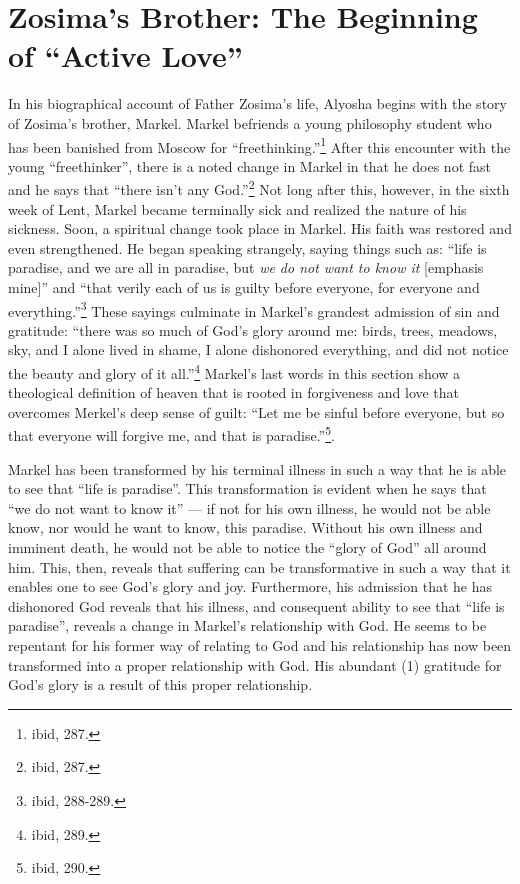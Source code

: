  \section{Zosima's Brother: The Beginning of ``Active Love''}
  
  In his biographical account of Father Zosima's life, Alyosha begins with the story of Zosima's brother, Markel. Markel befriends a young philosophy student who has been banished from Moscow for ``freethinking.''\footnote{ibid, 287.} After this encounter with the young ``freethinker'', there is a noted change in Markel in that he does not fast and he says that ``there isn't any God.''\footnote{ibid, 287.} Not long after this, however, in the sixth week of Lent, Markel became terminally sick and realized the nature of his sickness. Soon, a spiritual change took place in Markel. His faith was restored and even strengthened. He began speaking strangely, saying things such as: ``life is paradise, and we are all in paradise, but \emph{we do not want to know it} [emphasis mine]'' and ``that verily each of us is guilty before everyone, for everyone and everything.''\footnote{ibid, 288-289.} These sayings culminate in Markel's grandest admission of sin and gratitude: ``there was so much of God's glory around me: birds, trees, meadows, sky, and I alone lived in shame, I alone dishonored everything, and did not notice the beauty and glory of it all.''\footnote{ibid, 289.} Markel's last words in this section show a theological definition of heaven that is rooted in forgiveness and love that overcomes Merkel's deep sense of guilt: ``Let me be sinful before everyone, but so that everyone will forgive me, and that is paradise.''\footnote{ibid, 290.}.
  
  Markel has been transformed by his terminal illness in such a way that he is able to see that ``life is paradise''. This transformation is evident when he says that ``we do not want to know it'' --- if not for his own illness, he would not be able know, nor would he want to know, this paradise. Without his own illness and imminent death, he would not be able to notice the ``glory of God'' all around him. This, then, reveals that suffering can be transformative in such a way that it enables one to see God's glory and joy. Furthermore, his admission that he has dishonored God reveals that his illness, and consequent ability to see that ``life is paradise'', reveals a change in Markel's relationship with God. He seems to be repentant for his former way of relating to God and his relationship has now been transformed into a proper relationship with God. His abundant (1) gratitude for God's glory is a result of this proper relationship.
  
